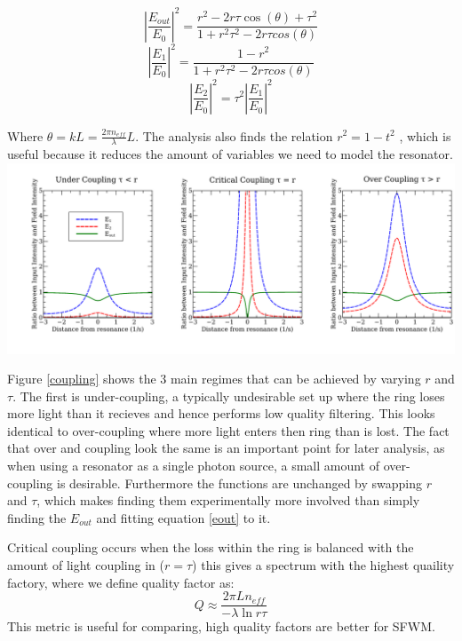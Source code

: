 \begin{equation} \label{eout}
\left |\frac{E_{out}}{E_{0}}\right|^2=\frac{r^2-2r\tau\cos(\theta)+\tau^2}{1+r^2\tau^2-2r\tau cos(\theta)}
\end{equation}
\begin{equation}
\left|\frac{E_{1}}{E_{0}}\right |^2=\frac{1-r^2}{1+r^2\tau^2-2r\tau cos(\theta)}
\end{equation}
\begin{equation}
\left |\frac{E_{2}}{E_{0}}\right |^2=\tau^2\left|\frac{E_{1}}{E_{0}}\right |^2
\end{equation}

Where $\theta=kL=\frac{2\pi n_{eff}}{\lambda}L$. The analysis also finds the relation $r^2 = 1 - t^2$ , which is useful because it reduces the amount of variables we need to model the resonator.
\begingroup
    \centering  
    \includegraphics[width=17cm]{img/theory/coupling.pdf}
     \vspace{3pt} \label{coupling}
\endgroup

Figure \ref{coupling} shows the 3 main regimes that can be achieved by varying $r$ and $\tau$. The first is under-coupling, a typically undesirable set up where the ring loses more light than it recieves and hence performs low quality filtering. This looks identical to over-coupling where more light enters then ring than is lost. The fact that over and coupling look the same is an important point for later analysis, as when using a resonator as a single photon source, a small amount of over-coupling is desirable. Furthermore the functions are unchanged by swapping $r$ and $\tau$, which makes finding them experimentally more involved than simply finding the $E_{out}$ and fitting equation \ref{eout} to it.

Critical coupling occurs when the loss within the ring is balanced with the amount of light coupling in ($r=\tau$) this gives a spectrum with the highest quaility factory, where we define quality factor\cite{niehusmann_ultrahigh-quality-factor_2004} as:
\begin{equation}
Q \approx \frac{2\pi L n_{eff}}{-\lambda \ln{r\tau}}
\end{equation}
\noindent
This metric is useful for comparing, high quality factors are better for SFWM. 


